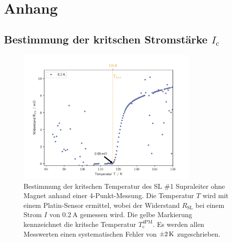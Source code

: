 \section{Anhang}
\label{sec:Anhang}

\subsection{Bestimmung der kritschen Stromstärke $I_{\text{c}}$}
\label{sec:AnhangTc}

\begin{figure}[H]
    \centering
    \includegraphics[width=0.8\textwidth]{Auswertung/I_krit_Pt/R_T_0.2A.pdf}
    \caption{Bestimmung der kritschen Temperatur des SL \#1 Supraleiter ohne Magnet
    anhand einer 4-Punkt-Messung. Die Temperatur $T$ wird mit einem Platin-Sensor
    ermittel, wobei der Widerstand $R_{\text{SL}}$ bei einem Strom $I$ von
    $\SI{0.2}{\ampere}$ gemessen wird.
		Die gelbe Markierung kennzeichnet die kritsche Temperatur	$T^{\text{4PM}}_{\text{c}}$.
		Es werden allen Messwerten einen systematischen Fehler von $\SI{\pm2}{\kelvin}$
		zugeschrieben.}
    \label{fig:Ic1.1}
\end{figure}

